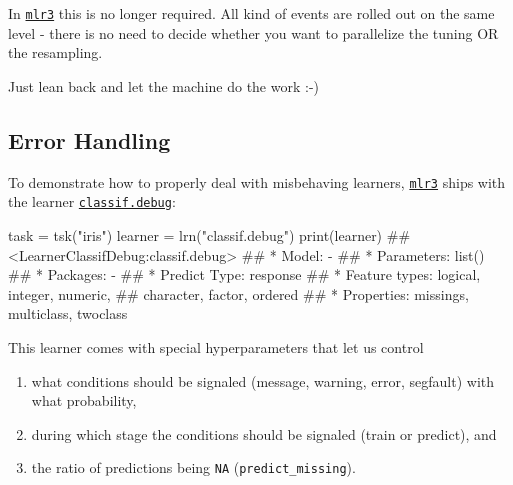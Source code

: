 \documentclass[]{article}
\newenvironment{Shaded}{}{}
\newcommand{\KeywordTok}[1]{\textcolor[rgb]{0.00,0.00,1.00}{#1}}
\newcommand{\NormalTok}[1]{#1}
\newcommand{\StringTok}[1]{\textcolor[rgb]{0.00,0.50,0.50}{#1}}
\providecommand{\tightlist}{%
  \setlength{\itemsep}{0pt}\setlength{\parskip}{0pt}}
\renewenvironment{Shaded} {\begin{snugshade}\small} {\end{snugshade}}
\begin{document}
In \href{https://github.com/mlr-org/mlr3}{\texttt{mlr3}} this is no longer required.
All kind of events are rolled out on the same level - there is no need to decide whether you want to parallelize the tuning OR the resampling.

Just lean back and let the machine do the work :-)

\hypertarget{error-handling}{%
\subsection{Error Handling}\label{error-handling}}

To demonstrate how to properly deal with misbehaving learners, \href{https://github.com/mlr-org/mlr3}{\texttt{mlr3}} ships with the learner \href{https://mlr3.mlr-org.com/reference/mlr_learners_classif.debug.html}{\texttt{classif.debug}}:

\begin{Shaded}
\begin{Highlighting}[]
\NormalTok{task =}\StringTok{ }\KeywordTok{tsk}\NormalTok{(}\StringTok{"iris"}\NormalTok{)}
\NormalTok{learner =}\StringTok{ }\KeywordTok{lrn}\NormalTok{(}\StringTok{"classif.debug"}\NormalTok{)}
\KeywordTok{print}\NormalTok{(learner)}
\NormalTok{## <LearnerClassifDebug:classif.debug>}
\NormalTok{## * Model: -}
\NormalTok{## * Parameters: list()}
\NormalTok{## * Packages: -}
\NormalTok{## * Predict Type: response}
\NormalTok{## * Feature types: logical, integer, numeric,}
\NormalTok{##   character, factor, ordered}
\NormalTok{## * Properties: missings, multiclass, twoclass}
\end{Highlighting}
\end{Shaded}

This learner comes with special hyperparameters that let us control

\begin{enumerate}
\def\labelenumi{\arabic{enumi}.}
\tightlist
\item
  what conditions should be signaled (message, warning, error, segfault) with what probability,
\item
  during which stage the conditions should be signaled (train or predict), and
\item
  the ratio of predictions being \texttt{NA} (\texttt{predict\_missing}).
\end{enumerate}
\end{document}
